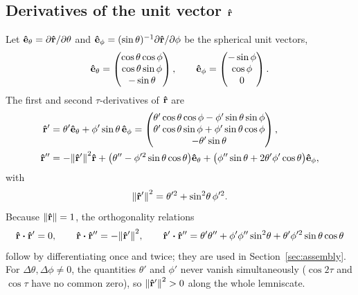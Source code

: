 \documentclass[10pt, a4paper]{article}
\begin{document}
\subsection[Derivatives of the unit vector r]{Derivatives of the unit vector $\vu r$}

Let $\mathbf{\hat{e}}_\theta = \partial \vu r / \partial\theta$ and
$\mathbf{\hat{e}}_\phi = (\sin\theta)^{-1} \partial \vu r / \partial\phi$ be the spherical
unit vectors,
\begin{equation}
    \mathbf{\hat{e}}_\theta = \begin{pmatrix}
        \cos\theta\cos\phi \\ \cos\theta\sin\phi \\ -\sin\theta
    \end{pmatrix},
    \qquad
    \mathbf{\hat{e}}_\phi = \begin{pmatrix} -\sin\phi \\ \cos\phi \\ 0 \end{pmatrix}.
\end{equation}
The first and second $\tau$-derivatives of $\vu r$ are
\begin{align}
    \vu r' &= \theta' \mathbf{\hat{e}}_\theta + \phi'\sin\theta \, \mathbf{\hat{e}}_\phi
    = \begin{pmatrix}
        \theta'\cos\theta\cos\phi - \phi'\sin\theta\sin\phi \\
        \theta'\cos\theta\sin\phi + \phi'\sin\theta\cos\phi \\
        -\theta'\sin\theta
    \end{pmatrix},
    \label{eq:rhat-prime}\\
    \vu r'' &= -\norm{\vu r'}^2 \vu r
    + \bigl( \theta'' - \phi'^2 \sin\theta\cos\theta \bigr) \mathbf{\hat{e}}_\theta
    + \bigl( \phi''\sin\theta + 2\theta'\phi'\cos\theta \bigr) \mathbf{\hat{e}}_\phi,
    \label{eq:rhat-second}
\end{align}
with
\begin{equation} \label{eq:rhat-prime-norm}
    \norm{\vu r'}^2 = \theta'^2 + \sin^2\!\theta\,\phi'^2.
\end{equation}
Because $\norm{\vu r} = 1$, the orthogonality relations
\begin{equation} \label{eq:rhat-ortho}
    \rhat \vdot \rhat' = 0,
    \qquad
    \rhat \vdot \rhat'' = -\norm{\rhat'}^2,
    \qquad
    \rhat' \vdot \rhat''
    = \theta'\theta'' + \phi'\phi''\sin^2\!\theta
    + \theta'\phi'^2\sin\theta\cos\theta
\end{equation}
follow by differentiating once and twice; they are used in
Section~\ref{sec:assembly}.  For $\Delta\theta, \Delta\phi \ne 0$, the
quantities $\theta'$ and $\phi'$ never vanish simultaneously
($\cos 2\tau$ and $\cos\tau$ have no common zero), so
$\norm{\vu r'}^2 > 0$ along the whole lemniscate.
\end{document}
